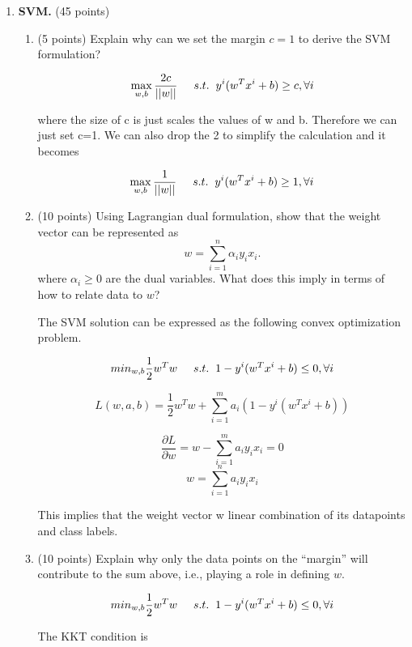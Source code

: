 \documentclass[twoside,10pt]{article}
\begin{document}
\begin{enumerate}


\item{\bf SVM. } (45 points)

\begin{enumerate}
\item (5 points) Explain why can we set the margin $c = 1$ to derive the SVM formulation? 

$$\max_{w,b}{\frac{2c}{||w||}} \hspace{5 mm} s.t. \hspace{2 mm} y^i(w^T x^i + b) \geq c, \forall i$$

where the size of c is just scales the values of w and b.  Therefore we can just set c=1.  We can also drop the 2 to simplify the calculation and it becomes

$$\max_{w,b}{\frac{1}{||w||}} \hspace{5 mm} s.t. \hspace{2 mm} y^i(w^T x^i + b) \geq 1, \forall i$$

\item (10 points) Using Lagrangian dual formulation, show that the weight vector can be represented as
\[
w = \sum_{i=1}^n \alpha_i y_i x_i.
\]
where $\alpha_i \geq 0$ are the dual variables. What does this imply in terms of how to relate data to $w$?

The SVM solution can be expressed as the following convex optimization problem.

$$min_{w,b}\frac{1}{2}w^Tw  \hspace{5 mm} s.t. \hspace{2 mm} 1 - y^i (w^Tx^i + b) \leq 0, \forall i$$

$$ L(w,a,b) = \frac{1}{2}w^Tw + \sum^m_{i=1}{a_i(1 - y^i (w^Tx^i + b))}$$

$$ \frac{\partial{L}}{\partial{w}} = w - \sum^m_{i=1}{a_iy_ix_i} = 0 $$
$$ w = \sum^n_{i=1}{a_iy_ix_i}$$

This implies that the weight vector w linear combination of its datapoints and class labels.

\item (10 points) Explain why only the data points on the ``margin'' will contribute to the sum above, i.e., playing a role in defining $w$. 

$$min_{w,b}\frac{1}{2}w^Tw  \hspace{5 mm} s.t. \hspace{2 mm} 1 - y^i (w^Tx^i + b) \leq 0, \forall i$$

The KKT condition is


\end{enumerate}
\end{enumerate}
\end{document}
